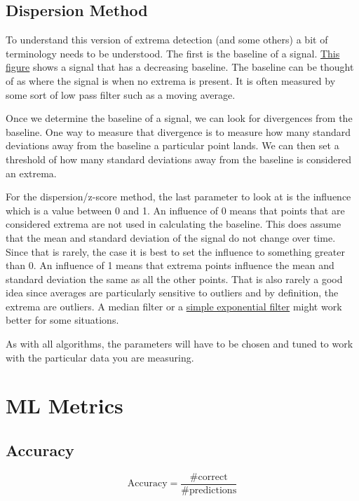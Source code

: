 \subsection{Dispersion Method}
To understand this version of extrema detection (and some others) a bit of terminology needs to 
be understood. The first is the baseline of a signal. \href{https://bmcbioinformatics.biomedcentral.com/articles/10.1186/1471-2105-10-4/figures/2}
{This figure} shows a signal that has a decreasing baseline. The baseline can be thought of as where the 
signal is when no extrema is present. It is often measured by some sort of low pass filter such as a moving 
average. 

Once we determine the baseline of a signal, we can look for divergences from the baseline. One way to 
measure that divergence is to measure how many standard deviations away from the baseline a particular 
point lands. We can then set a threshold of how many standard deviations away from the baseline is 
considered an extrema.

For the dispersion/z-score method, the last parameter to look at is the influence which is a value 
between 0 and 1. An influence of 0 means that points that are considered extrema are not used in 
calculating the baseline. This does assume that the mean and standard deviation of the signal do 
not change over time. Since that is rarely, the case it is best to set the influence to something greater 
than 0. An influence of 1 means that extrema points influence the mean and standard deviation the 
same as all the other points. That is also rarely a good idea since averages are particularly sensitive
to outliers and by definition, the extrema are outliers. A median filter or a 
\href{https://en.wikipedia.org/wiki/Exponential\_smoothing}{simple exponential filter} might work better
for some situations.

As with all algorithms, the parameters will have to be chosen and tuned to work with the particular data 
you are measuring.

\section{ML Metrics}

\subsection{Accuracy}
\begin{equation}
    \mathrm{Accuracy} = \frac{\mathrm{\# correct}}{\mathrm{\# predictions}}
\end{equation}


